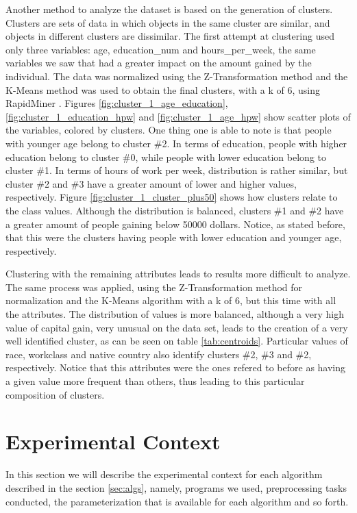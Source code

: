 \documentclass[a4paper]{llncs}
\begin{document}
Another method to analyze the dataset is based on the generation of clusters. 
Clusters are sets of data in which objects in the same cluster are similar, and
objects in different clusters are dissimilar. The first attempt at clustering
used only three variables: age, education\_num and hours\_per\_week, the same
variables we saw that had a greater impact on the amount gained by the
individual. The data was normalized using the Z-Transformation method and the 
K-Means method was used to obtain the final clusters, with a k of 6, using RapidMiner \cite{4}. Figures 
\ref{fig:cluster_1_age_education}, \ref{fig:cluster_1_education_hpw} and \ref{fig:cluster_1_age_hpw} show
scatter plots of the variables, colored by clusters. One thing one is able to
note is that people with younger age belong to cluster \#2. In terms of
education, people with higher education belong to cluster \#0, while people with
lower education belong to cluster \#1. In terms of hours of work per week, 
distribution is rather similar, but cluster \#2 and \#3 have a greater amount of
lower and higher values, respectively. Figure \ref{fig:cluster_1_cluster_plus50}
shows how clusters relate to the class values. Although the distribution is 
balanced, clusters \#1 and \#2 have a greater amount of people gaining below 
50000 dollars. Notice, as stated before, that this were the clusters having 
people with lower education and younger age, respectively.

Clustering with the remaining attributes leads to results more difficult to
analyze. The same process was applied, using the Z-Transformation method for
normalization and the K-Means algorithm with a k of 6, but this time with all
the attributes. The distribution of values is more balanced, although a very
high value of capital gain, very unusual on the data set, leads to the creation
of a very well identified cluster, as can be seen on table \ref{tab:centroids}.
Particular values of race, workclass and native country also identify clusters
\#2, \#3 and \#2, respectively. Notice that this attributes were the ones
refered to before as having a given value more frequent than others, thus
leading to this particular composition of clusters.


\section{Experimental Context}

In this section we will describe the experimental context for each
algorithm described in the section \ref{sec:algs}, namely, programs we used,
preprocessing tasks conducted, the parameterization that is available for each
algorithm and so forth.
\end{document}
